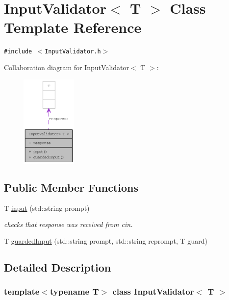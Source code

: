 \hypertarget{classInputValidator}{
\section{InputValidator$<$ T $>$ Class Template Reference}
\label{classInputValidator}
}
{\tt \#include $<$InputValidator.h$>$}

Collaboration diagram for InputValidator$<$ T $>$:\nopagebreak
\begin{figure}[H]
\begin{center}
\leavevmode
\includegraphics[width=77pt]{classInputValidator__coll__graph}
\end{center}
\end{figure}
\subsection*{Public Member Functions}
\begin{CompactItemize}
\item 
T \hyperlink{classInputValidator_4d554feb8dc41f8990e62a34d2678574}{input} (std::string prompt)
\begin{CompactList}\small\item\em checks that response was received from cin. \item\end{CompactList}\item 
T \hyperlink{classInputValidator_c00d4a6ca94d48eb3c8b9e2b57b31950}{guardedInput} (std::string prompt, std::string reprompt, T guard)
\end{CompactItemize}


\subsection{Detailed Description}
\subsubsection*{template$<$typename T$>$ class InputValidator$<$ T $>$}

